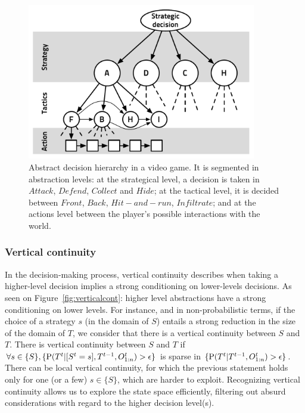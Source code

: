 \begin{figure}
\begin{center}
\includegraphics[width=10cm]{images/basic_abstract_decision_hierarchy3.pdf}
\end{center}
\caption{Abstract decision hierarchy in a video game. It is segmented in abstraction levels: at the strategical level, a decision is taken in $Attack$, $Defend$, $Collect$ and $Hide$; at the tactical level, it is decided between $Front$, $Back$, $Hit-and-run$, $Infiltrate$; and at the actions level between the player's possible interactions with the world.}
\label{fig:abstractdecisionhierarchy}
\end{figure}

\subsubsection{Vertical continuity}
\label{sec:verticalcontinuity}
In the decision-making process, vertical continuity describes when taking a higher-level decision implies a strong conditioning on lower-levels decisions. As seen on Figure~\ref{fig:verticalcont}: higher level abstractions have a strong conditioning on lower levels. For instance, and in non-probabilistic terms, if the choice of a strategy $s$ (in the domain of $S$) entails a strong reduction in the size of the domain of $T$, we consider that there is a vertical continuity between $S$ and $T$. There is vertical continuity between $S$ and $T$ if $\forall s \in \{S\}, \{\mathrm{P}(T^t|[S^t=s], T^{t-1}, O_{1:n}^t) > \epsilon\}$ is sparse in $\{\mathrm{P}(T^t|T^{t-1}, O_{1:n}^t) > \epsilon\}$. There can be local vertical continuity, for which the previous statement holds only for one (or a few) $s \in \{S\}$, which are harder to exploit. Recognizing vertical continuity allows us to explore the state space efficiently, filtering out absurd considerations with regard to the higher decision level(s).


